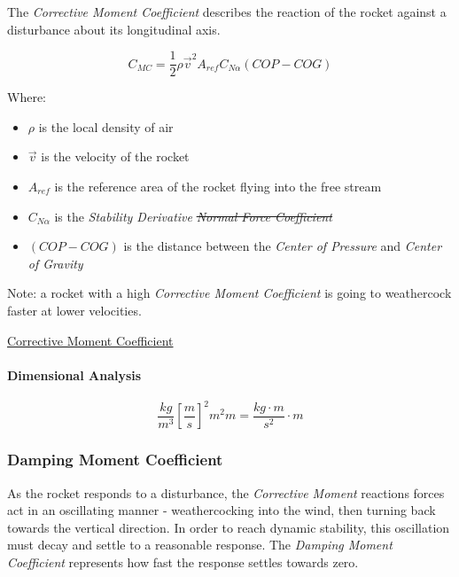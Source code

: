 \documentclass[]{article}
\providecommand{\tightlist}{%
  \setlength{\itemsep}{0pt}\setlength{\parskip}{0pt}}
\let\oldparagraph\paragraph
\renewcommand{\paragraph}[1]{\oldparagraph{#1}\mbox{}}
\begin{document}
The \emph{Corrective Moment Coefficient} describes the reaction of the
rocket against a disturbance about its longitudinal axis.

\begin{equation}
\label{eq_coef_moment_corrective}
C_{MC} = \dfrac{1}{2} \rho \vec{v}^2 A_{ref} C_{N \alpha} (COP-COG)
\end{equation}

Where:

\begin{itemize}
\tightlist
\item
  \(\rho\) is the local density of air
\item
  \(\vec{v}\) is the velocity of the rocket
\item
  \(A_{ref}\) is the reference area of the rocket flying into the free
  stream
\item
  \(C_{N \alpha}\) is the \emph{Stability Derivative} \sout{\emph{Normal
  Force Coefficient}}
\item
  \((COP-COG)\) is the distance between the \emph{Center of Pressure}
  and \emph{Center of Gravity}
\end{itemize}

Note: a rocket with a high \emph{Corrective Moment Coefficient} is going
to weathercock faster at lower velocities.

\href{https://www.apogeerockets.com/education/downloads/Newsletter193.pdf}{Corrective
Moment Coefficient}

\paragraph{Dimensional Analysis}\label{dimensional-analysis}

\begin{equation}
\label{eq_c1_dim_anal}
\dfrac{kg}{m^3} \left[ \dfrac{m}{s} \right]^2 m^2 m = \dfrac{kg \cdot m }{s^2} \cdot m 
\end{equation}

\subsubsection{Damping Moment
Coefficient}\label{damping-moment-coefficient}

As the rocket responds to a disturbance, the \emph{Corrective Moment}
reactions forces act in an oscillating manner - weathercocking into the
wind, then turning back towards the vertical direction. In order to
reach dynamic stability, this oscillation must decay and settle to a
reasonable response. The \emph{Damping Moment Coefficient} represents
how fast the response settles towards zero.
\end{document}
